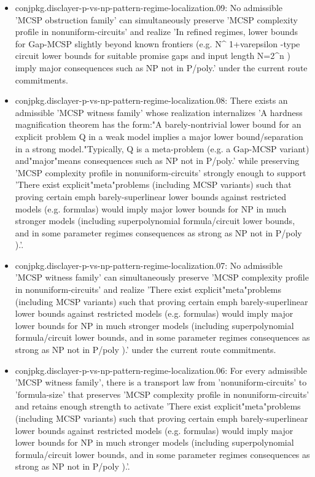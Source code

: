 \documentclass[11pt]{article}
\begin{document}
\begin{itemize}
\item conjpkg.disclayer-p-vs-np-pattern-regime-localization.09: No admissible 'MCSP obstruction family' can simultaneously preserve 'MCSP complexity profile in nonuniform-circuits' and realize 'In refined regimes, lower bounds for Gap-MCSP slightly beyond known frontiers (e.g. N\textasciicircum{} 1+varepsilon -type circuit lower bounds for suitable promise gaps and input length N=2\textasciicircum{}n ) imply major consequences such as NP not in P/poly.' under the current route commitments.
\item conjpkg.disclayer-p-vs-np-pattern-regime-localization.08: There exists an admissible 'MCSP witness family' whose realization internalizes 'A hardness magnification theorem has the form:"A barely-nontrivial lower bound for an explicit problem Q in a weak model implies a major lower bound/separation in a strong model."Typically, Q is a meta-problem (e.g. a Gap-MCSP variant) and"major"means consequences such as NP not in P/poly.' while preserving 'MCSP complexity profile in nonuniform-circuits' strongly enough to support 'There exist explicit"meta"problems (including MCSP variants) such that proving certain emph barely-superlinear lower bounds against restricted models (e.g. formulas) would imply major lower bounds for NP in much stronger models (including superpolynomial formula/circuit lower bounds, and in some parameter regimes consequences as strong as NP not in P/poly ).'.
\item conjpkg.disclayer-p-vs-np-pattern-regime-localization.07: No admissible 'MCSP witness family' can simultaneously preserve 'MCSP complexity profile in nonuniform-circuits' and realize 'There exist explicit"meta"problems (including MCSP variants) such that proving certain emph barely-superlinear lower bounds against restricted models (e.g. formulas) would imply major lower bounds for NP in much stronger models (including superpolynomial formula/circuit lower bounds, and in some parameter regimes consequences as strong as NP not in P/poly ).' under the current route commitments.
\item conjpkg.disclayer-p-vs-np-pattern-regime-localization.06: For every admissible 'MCSP witness family', there is a transport law from 'nonuniform-circuits' to 'formula-size' that preserves 'MCSP complexity profile in nonuniform-circuits' and retains enough strength to activate 'There exist explicit"meta"problems (including MCSP variants) such that proving certain emph barely-superlinear lower bounds against restricted models (e.g. formulas) would imply major lower bounds for NP in much stronger models (including superpolynomial formula/circuit lower bounds, and in some parameter regimes consequences as strong as NP not in P/poly ).'.

\end{itemize}
\end{document}
